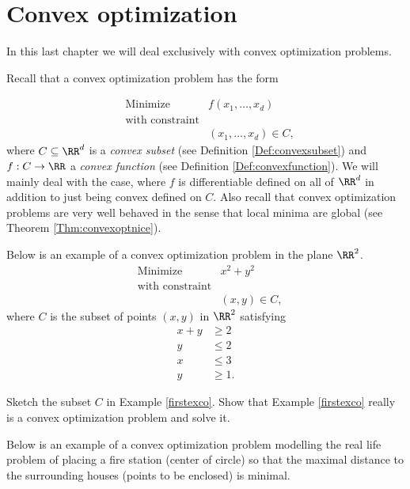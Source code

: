 \documentclass{article}
\begin{document}
\chapter{Convex optimization}

In this last chapter we will deal exclusively with convex optimization problems.

Recall that a convex optimization problem has the form

  \begin{align*}
    &\text{Minimize} &f(x_1, \dots, x_d)\\
    &\text{with constraint}\\
    &&(x_1, \dots, x_d)\in C,
  \end{align*}
  where $C\subseteq \RR^d$ is a \emph{convex subset} (see Definition \ref{Def:convexsubset}) and $f:C\rightarrow \RR$ a \emph{convex function} (see Definition \ref{Def:convexfunction}). We will mainly
  deal with the case, where $f$ is differentiable defined on all of $\RR^d$ in addition to just being convex defined on $C$. Also recall that convex optimization problems are very well behaved in the sense that local minima are global (see Theorem \ref{Thm:convexoptnice}).


  \begin{example}\label{firstexco}
    Below is an example of a convex optimization problem in the plane $\RR^2$.
    \begin{align*}
    &\text{Minimize} &x^2 + y^2\\
    &\text{with constraint}\\
    &&(x, y)\in C,
    \end{align*}
    where $C$ is the subset of points $(x, y)$ in $\RR^2$ satisfying
    \begin{align*}
      x + y &\geq 2\\
      y &\leq 2\\
      x &\leq 3\\
      y &\geq 1.
    \end{align*}
  \end{example}

  \beginshex
  Sketch the subset $C$ in Example \ref{firstexco}. Show that Example \ref{firstexco} really is a
  convex optimization problem and solve it.
  \endshex

  Below is an example of a convex optimization problem modelling the real life problem of placing a fire station (center of circle) so that the maximal distance to the surrounding houses (points to be enclosed) is minimal.
\end{document}
